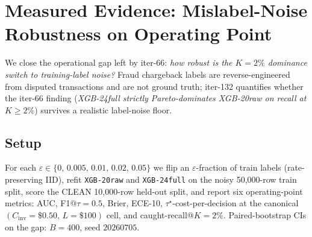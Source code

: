 \section{Measured Evidence: Mislabel-Noise Robustness on Operating Point}
\label{sec:p8-mislabel}

We close the operational gap left by iter-66: \emph{how robust is the
$K{=}2\%$ dominance switch to training-label noise?} Fraud chargeback
labels are reverse-engineered from disputed transactions and are not
ground truth; iter-132 quantifies whether the iter-66 finding
(\textit{XGB-24full strictly Pareto-dominates XGB-20raw on recall at
$K{\geq}2\%$}) survives a realistic label-noise floor.

\subsection{Setup}

For each $\varepsilon \in \{0,\,0.005,\,0.01,\,0.02,\,0.05\}$ we flip
an $\varepsilon$-fraction of train labels (rate-preserving IID), refit
\texttt{XGB-20raw} and \texttt{XGB-24full} on the noisy 50,000-row
train split, score the CLEAN 10,000-row held-out split, and report six
operating-point metrics: AUC, F1@$\tau{=}0.5$, Brier, ECE-10,
$\tau^{\star}$-cost-per-decision at the canonical
$(C_{\mathrm{inv}}{=}\$0.50,\,L{=}\$100)$ cell, and caught-recall@$K{=}2\%$.
Paired-bootstrap CIs on the gap: $B{=}400$, seed $20260705$.

